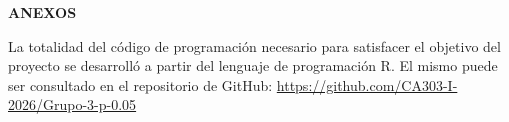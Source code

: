 
\begin{center}

{\fontsize{12pt}{14pt}\selectfont\textbf{ANEXOS}}

\end{center}

La totalidad del código de programación necesario para satisfacer el objetivo del proyecto se desarrolló a partir del lenguaje de programación R. El mismo puede ser consultado en el repositorio de GitHub: \url{https://github.com/CA303-I-2026/Grupo-3-p-0.05}
